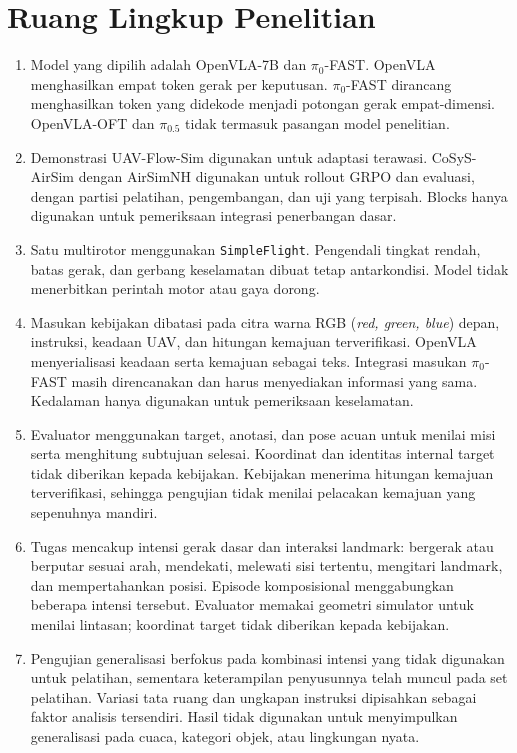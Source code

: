 \section{Ruang Lingkup Penelitian}
\label{sec:ruang_lingkup}
\begin{enumerate}
    \item Model yang dipilih adalah OpenVLA-7B dan $\pi_0$-FAST. OpenVLA menghasilkan empat token gerak per keputusan. $\pi_0$-FAST dirancang menghasilkan token yang didekode menjadi potongan gerak empat-dimensi. OpenVLA-OFT dan $\pi_{0.5}$ tidak termasuk pasangan model penelitian.
    \item Demonstrasi UAV-Flow-Sim digunakan untuk adaptasi terawasi. CoSyS-AirSim dengan AirSimNH digunakan untuk rollout GRPO dan evaluasi, dengan partisi pelatihan, pengembangan, dan uji yang terpisah. Blocks hanya digunakan untuk pemeriksaan integrasi penerbangan dasar.
    \item Satu multirotor menggunakan \texttt{SimpleFlight}. Pengendali tingkat rendah, batas gerak, dan gerbang keselamatan dibuat tetap antarkondisi. Model tidak menerbitkan perintah motor atau gaya dorong.
    \item Masukan kebijakan dibatasi pada citra warna RGB (\textit{red, green, blue}) depan, instruksi, keadaan UAV, dan hitungan kemajuan terverifikasi. OpenVLA menyerialisasi keadaan serta kemajuan sebagai teks. Integrasi masukan $\pi_0$-FAST masih direncanakan dan harus menyediakan informasi yang sama. Kedalaman hanya digunakan untuk pemeriksaan keselamatan.
    \item Evaluator menggunakan target, anotasi, dan pose acuan untuk menilai misi serta menghitung subtujuan selesai. Koordinat dan identitas internal target tidak diberikan kepada kebijakan. Kebijakan menerima hitungan kemajuan terverifikasi, sehingga pengujian tidak menilai pelacakan kemajuan yang sepenuhnya mandiri.
    \item Tugas mencakup intensi gerak dasar dan interaksi landmark: bergerak atau berputar sesuai arah, mendekati, melewati sisi tertentu, mengitari landmark, dan mempertahankan posisi. Episode komposisional menggabungkan beberapa intensi tersebut. Evaluator memakai geometri simulator untuk menilai lintasan; koordinat target tidak diberikan kepada kebijakan.
    \item Pengujian generalisasi berfokus pada kombinasi intensi yang tidak digunakan untuk pelatihan, sementara keterampilan penyusunnya telah muncul pada set pelatihan. Variasi tata ruang dan ungkapan instruksi dipisahkan sebagai faktor analisis tersendiri. Hasil tidak digunakan untuk menyimpulkan generalisasi pada cuaca, kategori objek, atau lingkungan nyata.

\end{enumerate}
